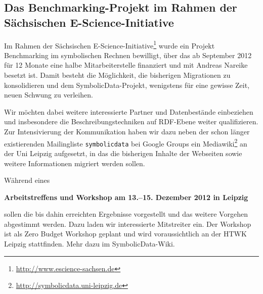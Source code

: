 \documentclass{article}
\newcommand{\SD}{{\sc Symbolic\-Data}}
\begin{document}
\subsection*{Das Benchmarking-Projekt im Rahmen der\\ Sächsischen
  E-Science-Initiative} 

Im Rahmen der Sächsischen
E-Science-Initiative\footnote{\url{http://www.escience-sachsen.de}} wurde ein
Projekt {\glqq}Benchmarking im symbolischen Rechnen{\grqq} bewilligt, über das
ab September 2012 für 12 Monate eine halbe Mitarbeiterstelle finanziert und
mit Andreas Nareike besetzt ist.  Damit besteht die Möglichkeit, die
bisherigen Migrationen zu konsolidieren und dem \SD-Projekt, wenigstens für
eine gewisse Zeit, neuen Schwung zu verleihen.

Wir möchten dabei weitere interessierte Partner und Datenbestände einbeziehen
und insbesondere die Beschreibungstechniken auf RDF-Ebene weiter
qualifizieren.  Zur Intensivierung der Kommunikation haben wir dazu neben der
schon länger existierenden Mailingliste \texttt{symbolicdata} bei Google
Groups ein Mediawiki\footnote{\url{http://symbolicdata.uni-leipzig.de}} an der
Uni Leipzig aufgesetzt, in das die bisherigen Inhalte der Webseiten sowie
weitere Informationen migriert werden sollen.

Während eines
\begin{center}\bf
  Arbeitstreffens und Workshop am 13.--15. Dezember 2012 in Leipzig
\end{center}
sollen die bis dahin erreichten Ergebnisse vorgestellt und das weitere
Vorgehen abgestimmt werden. Dazu laden wir interessierte Mitstreiter ein.  Der
Workshop ist als {\glqq}Zero Budget Workshop{\grqq} geplant und wird
voraussichtlich an der HTWK Leipzig stattfinden.  Mehr dazu im \SD-Wiki.
\end{document}
